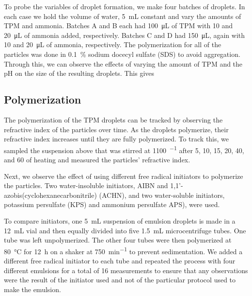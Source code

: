 To probe the variables of droplet formation, we make four batches of droplets.
In each case we hold the volume of water, \SI{5}{\milli \liter} constant 
and vary the amounts of TPM and ammonia. Batches A and B each had 
\SI{100}{\micro\liter} of TPM with \si{10} and \SI{20}{\micro\liter} of 
ammonia added, respectively. Batches C and D had \SI{150}{\micro\liter}, 
again with \si{10} and \SI{20}{\micro\liter} of ammonia, respectively. 
The polymerization for all of the particles was done in \SI{0.1}{\percent} 
sodium docecyl sulfate (SDS) to avoid aggregation.
Through this, we can observe the effects of varying 
the amount of TPM and the pH on the size of the resulting droplets.
This gives 

\subsection{Polymerization}

The polymerization of the TPM droplets can be tracked by observing the 
refractive index of the particles over time. As the droplets polymerize, 
their refractive index increases until they are fully polymerized. To track 
this, we sampled the suspension above that was stirred at \SI{1100}{\min^{-1}}
after \si{5}, \si{10}, \si{15}, \si{20}, \si{40}, and \SI{60}{\min} of 
heating and measured the particles' refractive index. 

Next, we observe the effect of using different free radical initiators 
to polymerize the particles. Two water-insoluble initiators, AIBN and
\num{1},\num{1}'-azobis(cyclohexanecarbonitrile) (ACHN), and two water-soluble 
initiators, potassium persulfate (KPS) and ammonium persulfate APS), were 
used.

To compare initiators, one \SI{5}{\milli \liter} suspension of emulsion droplets is
made in a \SI{12}{\milli \liter} vial and then equally divided into five
\SI{1.5}{\milli \liter} microcentrifuge tubes. One tube was left unpolymerized. The
other four tubes were then polymerized at \SI{80}{\celsius} 
for \SI{12}{\hour} on a shaker at \SI{750}{\minute^{-1}} %
to prevent sedimentation.
We added a different free radical initiator to each tube and repeated the process with four
different emulsions for a total of 
\num{16} measurements to ensure that any observations were the result of the 
initiator used and not of the particular protocol used to make the emulsion.


